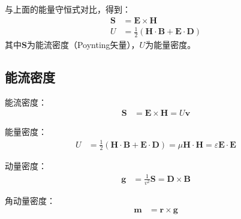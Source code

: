 \documentclass[12pt,onecolumn,a4paper]{book}
\numberwithin{table}{subsection}
\numberwithin{equation}{subsection}
\begin{document}
    与上面的能量守恒式对比，得到：
    \begin{align}
        \mathbf{S} & = \mathbf{E} \times \mathbf{H}                                        \\
        U          & = \frac{1}{2} (\mathbf{H}\cdot \mathbf{B}+\mathbf{E}\cdot \mathbf{D})
    \end{align}
    其中$\mathbf{S}$为能流密度（Poynting矢量），$U$为能量密度。

\subsection{能流密度}

能流密度：
\begin{align}
    \mathbf{S} & = \mathbf{E} \times \mathbf{H} = U \mathbf{v}
\end{align}

能量密度：
\begin{align}
    U & = \frac{1}{2} (\mathbf{H}\cdot \mathbf{B}+\mathbf{E}\cdot \mathbf{D}) = \mu \mathbf{H}\cdot \mathbf{H} = \varepsilon \mathbf{E}\cdot \mathbf{E}
\end{align}

动量密度：
\begin{align}
    \mathbf{g} & = \frac{1}{v^2} \mathbf{S} = \mathbf{D} \times \mathbf{B}
\end{align}

角动量密度：
\begin{align}
    \mathbf{m} & = \mathbf{r} \times \mathbf{g}
\end{align}
\end{document}
